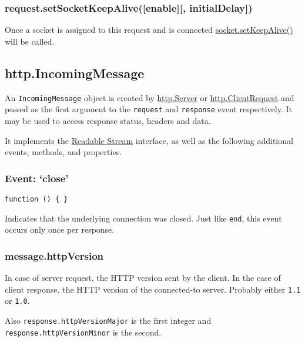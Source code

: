 \subsubsection{request.setSocketKeepAlive({[}enable{]}{[},
initialDelay{]})}\label{request.setsocketkeepaliveenable-initialdelay}

Once a socket is assigned to this request and is connected
\href{net.html\#net_socket_setkeepalive_enable_initialdelay}{socket.setKeepAlive()}
will be called.

\subsection{http.IncomingMessage}\label{http.incomingmessage}

An \texttt{IncomingMessage} object is created by
\hyperref[httpux5fclassux5fhttpux5fserver]{http.Server} or
\hyperref[httpux5fclassux5fhttpux5fclientrequest]{http.ClientRequest}
and passed as the first argument to the
\texttt{\textquotesingle{}request\textquotesingle{}} and
\texttt{\textquotesingle{}response\textquotesingle{}} event
respectively. It may be used to access response status, headers and
data.

It implements the
\href{stream.html\#stream_class_stream_readable}{Readable Stream}
interface, as well as the following additional events, methods, and
properties.

\subsubsection{\texorpdfstring{Event:
`close'}{Event: close}}\label{event-close-2}

\texttt{function\ ()\ \{\ \}}

Indicates that the underlying connection was closed. Just like
\texttt{\textquotesingle{}end\textquotesingle{}}, this event occurs only
once per response.

\subsubsection{message.httpVersion}\label{message.httpversion}

In case of server request, the HTTP version sent by the client. In the
case of client response, the HTTP version of the connected-to server.
Probably either \texttt{\textquotesingle{}1.1\textquotesingle{}} or
\texttt{\textquotesingle{}1.0\textquotesingle{}}.

Also \texttt{response.httpVersionMajor} is the first integer and
\texttt{response.httpVersionMinor} is the second.

